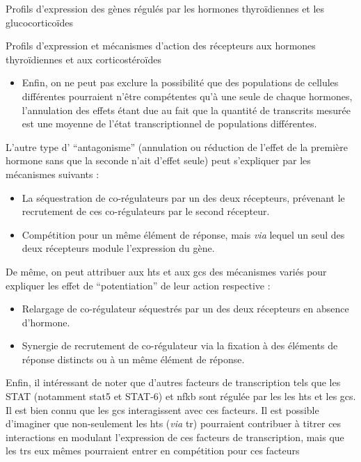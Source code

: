 \documentclass[../main.tex]{subfiles}
\begin{document}
\begin{chapter}{Profils d'expression des gènes régulés par les hormones thyroïdiennes et les glucocorticoïdes}
\begin{section}{Profils d'expression et mécanismes d'action des récepteurs aux hormones thyroïdiennes et aux corticostéroïdes}
\begin{itemize}
\item Enfin, on ne peut pas exclure la possibilité que des populations de cellules différentes pourraient n'être compétentes qu'à une seule de chaque hormones, l'annulation des effets étant due au fait que la quantité de transcrits mesurée est une moyenne de l'état transcriptionnel de populations différentes.
\end{itemize}
L'autre type d' ``antagonisme'' (annulation ou réduction de l'effet de la première hormone sans que la seconde n'ait d'effet seule) peut s'expliquer par les mécanismes suivants :
\begin{itemize}
\item La séquestration de co-régulateurs par un des deux récepteurs, prévenant le recrutement de ces co-régulateurs par le second récepteur.
\item Compétition pour un même élément de réponse, mais \textit{via} lequel un seul des deux récepteurs module l'expression du gène.
\end{itemize}
\par
De même, on peut attribuer aux \glspl{ht} et aux \glspl{gc} des mécanismes variés pour expliquer les effet de ``potentiation'' de leur action respective :
\begin{itemize}
\item Relargage de co-régulateur séquestrés par un des deux récepteurs en absence d'hormone.
\item Synergie de recrutement de co-régulateur via la fixation à des éléments de réponse distincts ou à un même élément de réponse.
\end{itemize}
Enfin, il intéressant de noter que d'autres facteurs de transcription tels que les STAT (notamment \gls{stat5} et STAT-6) et \gls{nfkb} sont régulée par les les \glspl{ht} et les \glspl{gc}.
Il est bien connu que les \glspl{gc} interagissent avec ces facteurs.
Il est possible d’imaginer que non-seulement les \glspl{ht} (\textit{via} \gls{tr}) pourraient contribuer à titrer ces interactions en modulant l'expression de ces facteurs de transcription, mais que les \glspl{tr} eux mêmes pourraient entrer en compétition pour ces facteurs \ 

\end{section}

\end{chapter}
\end{document}
